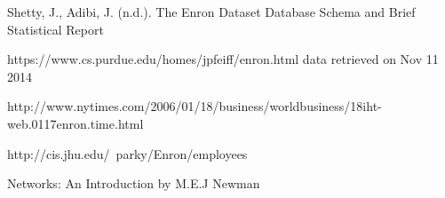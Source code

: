 \documentclass[12pt]{article}
\begin{document}
\begin{thebibliography}{9}

Shetty, J., Adibi, J. (n.d.). The Enron Dataset
Database Schema and Brief Statistical Report

https://www.cs.purdue.edu/homes/jpfeiff/enron.html
data retrieved on Nov 11 2014

http://www.nytimes.com/2006/01/18/business/worldbusiness/18iht-web.0117enron.time.html

http://cis.jhu.edu/~parky/Enron/employees

Networks: An Introduction by M.E.J Newman


\end{thebibliography}
\end{document}
